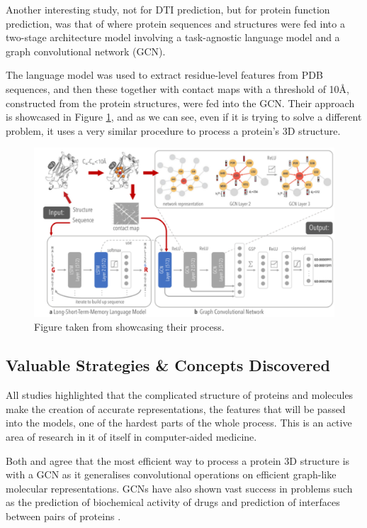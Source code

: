 \pagebreak

Another interesting study, not for DTI prediction, but for protein function prediction, was that of \citet{Gligorijević} where protein sequences and structures were fed into a two-stage architecture model involving a task-agnostic language model and a graph convolutional network (GCN). 

The language model was used to extract residue-level features from PDB sequences, and then these together with contact maps with a threshold of 10\AA, constructed from the protein structures, were fed into the GCN. Their approach is showcased in Figure \ref{fig:Gligorijevic_Process}, and as we can see, even if it is trying to solve a different problem, it uses a very similar procedure to process a protein's 3D structure.

\begin{figure}[!ht]
    \centering
    \includegraphics[width=1.0\linewidth]{images/Gligorijevic_Process.pdf}    
    \caption{Figure taken from \citet{Gligorijević} showcasing their process.}
    \label{fig:Gligorijevic_Process} 
\end{figure}

\subsection{Valuable Strategies \& Concepts Discovered}

All studies highlighted that the complicated structure of proteins and molecules make the creation of accurate representations, the features that will be passed into the models, one of the hardest parts of the whole process. This is an active area of research in it of itself in computer-aided medicine. \citep{Jiang2020}

Both \citet{Jiang2020} and \citet{Gligorijević} agree that the most efficient way to process a protein 3D structure is with a GCN as it generalises convolutional operations on efficient graph-like molecular representations. GCNs have also shown vast success in problems such as the prediction of biochemical activity of drugs and prediction of interfaces between pairs of proteins \citep{Gligorijević}.

\pagebreak